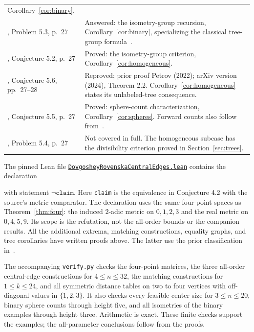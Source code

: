 \documentclass[11pt]{article}
\begin{document}
\begin{longtable}{@{}>{\raggedright\arraybackslash}p{.34\linewidth}>{\raggedright\arraybackslash}p{.59\linewidth}@{}}
Corollary~\ref{cor:binary}.\\[3pt]
\cite{BT}, Problem 5.3, p.~27 &
Answered: the isometry-group recursion, Corollary~\ref{cor:binary},
specializing the classical tree-group formula~\cite{G}.\\[3pt]
\cite{BT}, Conjecture 5.2, p.~27 &
Proved: the isometry-group criterion, Corollary~\ref{cor:homogeneous}.\\[3pt]
\cite{BT}, Conjecture 5.6, pp.~27--28 &
Reproved; prior proof Petrov (2022); arXiv version (2024), Theorem 2.2.
Corollary~\ref{cor:homogeneous} states its unlabeled-tree consequence.\\[3pt]
\cite{BT}, Conjecture 5.5, p.~27 &
Proved: sphere-count characterization, Corollary~\ref{cor:spheres}.
Forward counts also follow from~\cite[Theorem 7.3]{KSI}.\\[3pt]
\cite{BT}, Problem 5.4, p.~27 &
Not covered in full. The homogeneous subcase has the divisibility
criterion proved in Section~\ref{sec:trees}.\\
\bottomrule
\end{longtable}
\normalsize

The pinned Lean file
\href{https://github.com/the-omega-institute/trureturing/blob/8aa554ef66d0c1970b81b49632cd8a73a09ee34f/D5/S3/Combinatorics/Geometry/DovgosheyRovenskaCentralEdges.lean}{\texttt{DovgosheyRovenskaCentralEdges.lean}}
contains the declaration
\begin{center}\small
{}
\end{center}
with statement $\neg\texttt{claim}$. Here \texttt{claim} is the
equivalence in Conjecture 4.2 with the source's metric comparator.
The declaration uses the same four-point spaces as
Theorem~\ref{thm:four}: the induced $2$-adic metric on $0,1,2,3$
and the real metric on $0,4,5,9$. Its scope is the refutation,
not the all-order bounds or the companion results.
All the additional extrema, matching constructions, equality graphs,
and tree corollaries have written proofs above. The latter use the
prior classification in~\cite[Theorem 4.1]{BT}.

The accompanying \texttt{verify.py} checks the four-point matrices,
the three all-order central-edge constructions for $4\le n\le32$,
the matching constructions for $1\le k\le24$, and all symmetric
distance tables on two to four vertices with off-diagonal values
in $\{1,2,3\}$. It also checks every feasible center size for
$3\le n\le20$, binary sphere counts through height five,
and all isometries of the binary examples through height three.
Arithmetic is exact. These finite checks support
the examples; the all-parameter conclusions follow from the proofs.
\end{document}
